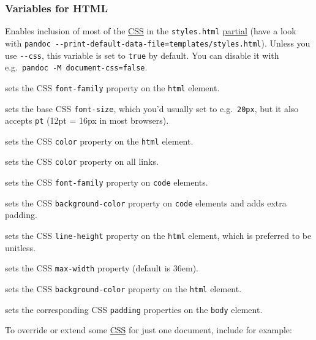 \documentclass[
]{article}
\providecommand{\tightlist}{%
  \setlength{\itemsep}{0pt}\setlength{\parskip}{0pt}}
\begin{document}
\hypertarget{variables-for-html}{%
\subsubsection{Variables for HTML}\label{variables-for-html}}

\begin{description}
\tightlist
\item[\texttt{document-css}]
Enables inclusion of most of the
\href{https://developer.mozilla.org/en-US/docs/Learn/CSS}{CSS} in the
\texttt{styles.html} \protect\hyperlink{partials}{partial} (have a look
with
\texttt{pandoc\ -\/-print-default-data-file=templates/styles.html}).
Unless you use \texttt{-\/-css}, this variable is set to \texttt{true}
by default. You can disable it with
e.g.~\texttt{pandoc\ -M\ document-css=false}.
\item[\texttt{mainfont}]
sets the CSS \texttt{font-family} property on the \texttt{html} element.
\item[\texttt{fontsize}]
sets the base CSS \texttt{font-size}, which you'd usually set to
e.g.~\texttt{20px}, but it also accepts \texttt{pt} (12pt = 16px in most
browsers).
\item[\texttt{fontcolor}]
sets the CSS \texttt{color} property on the \texttt{html} element.
\item[\texttt{linkcolor}]
sets the CSS \texttt{color} property on all links.
\item[\texttt{monofont}]
sets the CSS \texttt{font-family} property on \texttt{code} elements.
\item[\texttt{monobackgroundcolor}]
sets the CSS \texttt{background-color} property on \texttt{code}
elements and adds extra padding.
\item[\texttt{linestretch}]
sets the CSS \texttt{line-height} property on the \texttt{html} element,
which is preferred to be unitless.
\item[\texttt{maxwidth}]
sets the CSS \texttt{max-width} property (default is 36em).
\item[\texttt{backgroundcolor}]
sets the CSS \texttt{background-color} property on the \texttt{html}
element.
\item[\texttt{margin-left}, \texttt{margin-right}, \texttt{margin-top},
\texttt{margin-bottom}]
sets the corresponding CSS \texttt{padding} properties on the
\texttt{body} element.
\end{description}

To override or extend some
\href{https://developer.mozilla.org/en-US/docs/Learn/CSS}{CSS} for just
one document, include for example:
\end{document}
